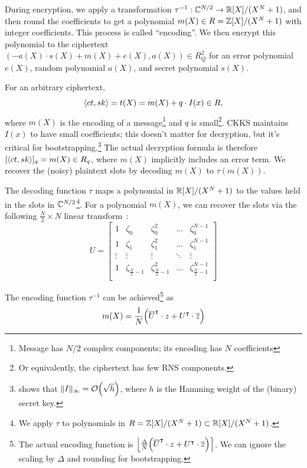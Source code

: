\documentclass[../fheimpl.tex]{subfiles}
\begin{document}
    During encryption, we apply a transformation $\tau^{-1}: \mathbb{C}^{N/2}\rightarrow \mathbb{R}[X]/(X^N+1)$, and then round the coefficients to get a polynomial $m(X)\in R=\mathbb{Z}[X]/(X^N+1)$ with integer coefficients. This process is called ``encoding''. We then encrypt this polynomial to the ciphertext $(-a(X)\cdot s(X) + m(X) + e(X), a(X))\in R_Q^2$ for an error polynomial $e(X)$, random polynomial $a(X)$, and secret polynomial $s(X)$.
	
    For an arbitrary ciphertext, 
    \[\langle ct, sk\rangle = t(X) = m(X)+q\cdot I(x)\in R,\]
    where $m(X)$ is the encoding of a message\footnote{Message has $N/2$ complex components; its encoding has $N$ coefficients} and $q$ is small\footnote{Or equivalently, the ciphertext has few RNS components.}. CKKS maintains $I(x)$ to have small coefficients; this doesn't matter for decryption, but it's critical for bootstrapping.\footnote{\label{footnote:sparsekey}\cite{cryptoeprint:2018/153} shows that $\length{I}_\infty = \mathcal{O}\parens*{\sqrt{h}}$, where $h$ is the Hamming weight of the (binary) secret key.} The actual decryption formula is therefore $[\langle ct, sk\rangle]_q = m(X)\in R_q$, where $m(X)$ implicitly includes an error term. We recover the (noisy) plaintext slots by decoding $m(X)$ to $\tau(m(X))$.
	
    The decoding function $\tau$ maps a polynomial in $\mathbb{R}[X]/(X^N+1)$ to the values held in the slots in $\mathbb{C}^{N/2}$\footnote{We apply $\tau$ to polynomials in $R=\mathbb{Z}[X]/(X^N+1)\subset \mathbb{R}[X]/(X^N+1)$.}. For a polynomial $m(X)$, we can recover the slots via the following $\frac{N}{2}\times N$ linear transform~\cite{cryptoeprint:2018/153}:
    \[U=
	\begin{bmatrix}
		1 & \zeta_0 & \zeta_0^2 & \ldots & \zeta_0^{N-1} \\
		1 & \zeta_1 & \zeta_1^2 & \ldots & \zeta_1^{N-1} \\
		\vdots & \vdots & \vdots & \ddots & \vdots \\
		1 & \zeta_{\frac{N}{2}-1} & \zeta_{\frac{N}{2}-1}^2 & \ldots & \zeta_{\frac{N}{2}-1}^{N-1} \\
		
	\end{bmatrix}
    \]
	
    The encoding function $\tau^{-1}$ can be achieved\footnote{The actual encoding function is $\round*{\frac{\Delta}{N}\parens*{\overline{U}^\intercal\cdot z+U^\intercal \cdot \overline{z}}}$. We can ignore the scaling by $\Delta$ and rounding for bootstrapping.} as
    \[m(X) = \frac{1}{N}\parens*{\overline{U}^\intercal\cdot z+U^\intercal \cdot \overline{z}}\]
\end{document}
